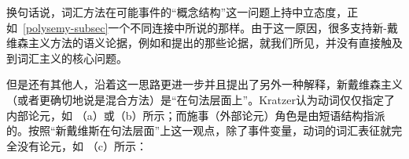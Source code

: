 \ea\label{kill-argst-two}
\z
换句话说，词汇方法在可能事件的“概念结构”这一问题上持中立态度，正如~\ref{polysemy-subsec}一个不同连接中所说的那样。由于这一原因，很多支持新-戴维森主义方法的语义论据，例如\citet[\S~4]{Schein93a-u}和\citet{Lohndal2012a}提出的那些论据，就我们所见，并没有直接触及到词汇主义的核心问题。

\addlines[2]
    但是\citet{Kratzer96a}还有其他人，沿着这一思路更进一步并且提出了另外一种解释，新戴维森主义（或者更确切地说是混合方法）是“在句法层面上”。Kratzer认为动词仅仅指定了内部论元，如 （a）或（b）所示；而施事（外部论元）角色是由短语结构指派的。按照“新戴维斯在句法层面”上这一观点，除了事件变量，动词的词汇表征就完全没有论元，如 （c）所示：

